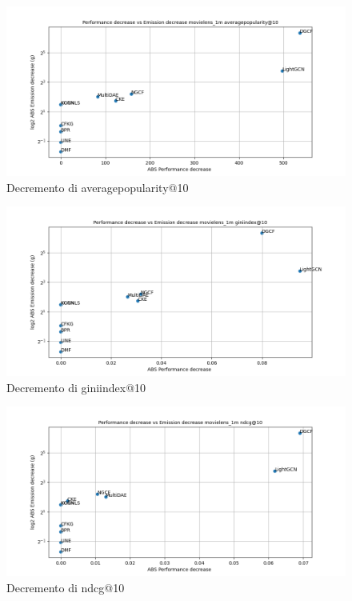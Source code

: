 \begin{figure}[H]
    \centering
     \includegraphics[width=\textwidth]{images/decrement_averagepopularity@10_movielens_1m_30_7.png}
    \caption{Decremento di averagepopularity@10}
\end{figure}

\begin{figure}[H]
    \centering
     \includegraphics[width=\textwidth]{images/decrement_giniindex@10_movielens_1m_30_7.png}
    \caption{Decremento di giniindex@10}
\end{figure}

\begin{figure}[H]
    \centering
     \includegraphics[width=\textwidth]{images/decrement_ndcg@10_movielens_1m_30_7.png}
    \caption{Decremento di ndcg@10}
\end{figure}

